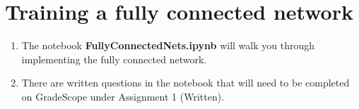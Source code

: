 \section{Training a fully connected network}

\begin{enumerate}
    \item {} The notebook \textbf{FullyConnectedNets.ipynb} will walk you through implementing the fully connected network. 
    \item {} There are written questions in the notebook that will need to be completed on GradeScope under Assignment 1 (Written).
\end{enumerate}
